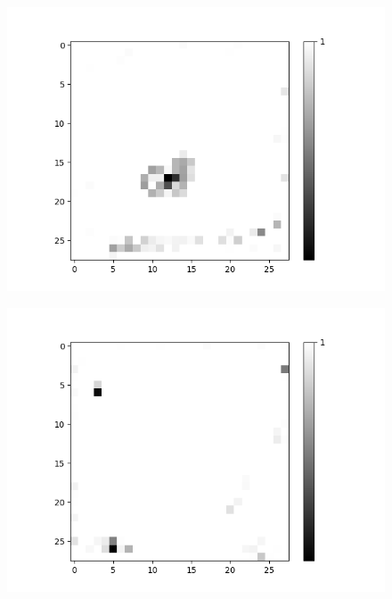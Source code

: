 \begin{figure}[H]
\begin{minipage}[b]{0.19\textwidth}
		\includegraphics[width=\textwidth]{LoAE(AND)(20LF)/False/Feature-10.png}
		\label{}
	\end{minipage}
	\begin{minipage}[b]{0.19\textwidth}
		\includegraphics[width=\textwidth]{LoAE(AND)(20LF)/False/Feature-12.png}
		\label{}
	\end{minipage}
	\begin{minipage}[b]{0.19\textwidth}

\end{minipage}
\end{figure}
